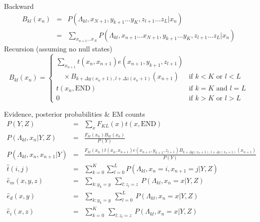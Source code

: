 \documentclass{beamer}
\begin{document}
\begin{frame}{}

\small
Backward
\begin{eqnarray*}
B_{kl}(x_n)
& = & P \left( \Lambda_{kl},x_{N+1},y_{k+1} \ldots y_K,z_{l+1} \ldots z_L | x_n \right) \\
& = & \sum_{x_{n+1} \ldots x_N}
P \left( \Lambda_{kl},x_{n+1} \ldots x_{N+1},y_{k+1} \ldots y_K,z_{l+1} \ldots z_L | x_n \right)
\end{eqnarray*}
Recursion (assuming no null states)
\[
B_{kl}(x_n) = \left\{ \begin{array}{ll} \displaystyle
\sum_{x_{n+1}}
t(x_n,x_{n+1})
e(x_{n+1},y_{k+1},z_{l+1}) & \\ \quad \times
B_{k+\Delta y(x_n+1),l+\Delta z(x_n+1)}(x_{n+1}) & \mbox{if $k < K$ or $l < L$} \\
t(x_n,\mbox{END}) & \mbox{if $k=K$ and $l=L$} \\
0 & \mbox{if $k > K$ or $l > L$}
\end{array} \right.
\]

\end{frame}

\begin{frame}{}

\tiny
Evidence, posterior probabilities \& EM counts
\begin{eqnarray*}
P(Y,Z) & = & \sum_x F_{KL}(x) t(x,\mbox{END}) \\
P(\Lambda_{kl},x_n|Y,Z) & = & \frac{F_{kl}(x_n) B_{kl}(x_n)}{P(Y)} \\
P(\Lambda_{kl},x_n,x_{n+1}|Y) & = & \frac{F_{kl}(x_n) t(x_n,x_{n+1}) e(x_{n+1},y_{k+1},z_{l+1})
B_{k+\Delta y(x_n+1),l+\Delta z(x_n+1)}(x_{n+1})}{P(Y)} \\
\hat{t}(i,j) & = & \sum_{k=0}^K \sum_{l=0}^L P(\Lambda_{kl},x_n=i,x_{n+1}=j|Y,Z) \\
\hat{e}_m(x,y,z) & = & \sum_{k:y_k=y}\ \sum_{l:z_l=z}\ P(\Lambda_{kl},x_n=x|Y,Z) \\
\hat{e}_d(x,y) & = & \sum_{k:y_k=y}\ \sum_{l=0}^L\ P(\Lambda_{kl},x_n=x|Y,Z) \\
\hat{e}_i(x,z) & = & \sum_{k=0}^K\ \sum_{l:z_l=z}\ P(\Lambda_{kl},x_n=x|Y,Z)
\end{eqnarray*}

\end{frame}
\end{document}
